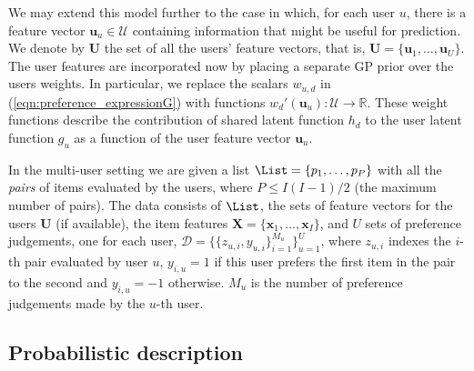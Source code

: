 We may extend this model further to the case in which, for each user $u$, there is a feature vector $\mathbf{u}_u \in \mathcal{U}$ containing information that might be useful for prediction. We denote by $\mathbf{U}$ the set of all the users' feature vectors, that is, $\mathbf{U} = \{\mathbf{u}_1,\ldots,\mathbf{u}_U\}$. The user features are incorporated now by placing a separate GP prior over the users weights. In particular, we replace the scalars $w_{u,d}$ in (\ref{eqn:preference_expressionG}) with functions $w_d'(\mathbf{u}_u):\mathcal{U}\rightarrow\mathcal{\mathbb{R}}$.  These weight functions describe the contribution of shared latent function $h_d$ to the user latent function $g_u$ as a function of the user feature vector $\mathbf{u}_u$.

In the multi-user setting we are given a list
$\List=\{p_1,\ldots,p_P\}$ with all the \emph{pairs} of items evaluated by the users, where $P\leq I(I-1)/2$ (the maximum number of pairs). The data consists of $\List$, the sets of feature vectors for the users $\mathbf{U}$ (if available), the item features $\mathbf{X}=\{\mathbf{x}_1,\ldots,\mathbf{x}_I\}$, and $U$ sets of preference judgements, one for each user, $\mathcal{D}=\{\{z_{u,i},y_{u,i}\}_{i=1}^{M_u}\}_{u=1}^{U}$, where $z_{u,i}$ indexes the $i$-th pair evaluated by user $u$, $y_{i,u}=1$ if this user prefers the first item in the pair to the second and $y_{i,u}=-1$ otherwise. $M_u$ is the number of  preference judgements made by the $u$-th user.

\subsection{Probabilistic description}

